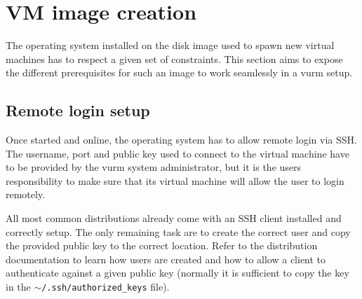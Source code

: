 %
%
%
%
%
%
%
%
%
%
%

\section{VM image creation}
\label{sec:vm-creation}

The operating system installed on the disk image used to spawn new virtual machines has to respect a given set of constraints. This section aims to expose the different prerequisites for such an image to work seamlessly in a \gls{vurm} setup.

\subsection{Remote login setup}

Once started and online, the operating system has to allow remote login via SSH. The username, port and public key used to connect to the virtual machine have to be provided by the \gls{vurm} system administrator, but it is the users responsibility to make sure that its virtual machine will allow the user to login remotely.

All most common distributions already come with an SSH client installed and correctly setup. The only remaining task are to create the correct user and copy the provided public key to the correct location. Refer to the distribution documentation to learn how users are created and how to allow a client to authenticate against a given public key (normally it is sufficient to copy the key in the \texttt{$\sim$/.ssh/authorized\_keys} file).


